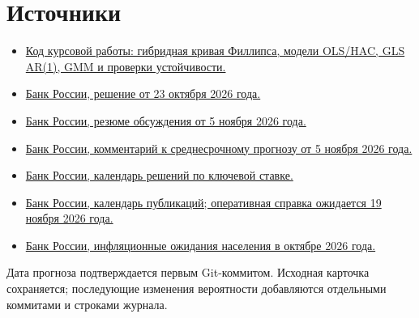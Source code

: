 \documentclass[10pt,a4paper]{article}
\newcommand{\source}[2]{\href{#1}{#2}}
\begin{document}
\section*{Источники}
\begin{itemize}
\setlength{\itemsep}{0pt}
\item \source{https://github.com/mkefimov/Philips-Curve-Inflation-and-Economic-Growth-Modelling-in-R}{Код курсовой работы: гибридная кривая Филлипса, модели OLS/HAC, GLS AR(1), GMM и проверки устойчивости.}
\item \source{https://www.cbr.ru/press/keypr/}{Банк России, решение от 23 октября 2026 года.}
\item \source{https://www.cbr.ru/dkp/mp_dec/decision_key_rate/summary_key_rate_05112026/}{Банк России, резюме обсуждения от 5 ноября 2026 года.}
\item \source{https://www.cbr.ru/dkp/mp_dec/decision_key_rate/comment_05112026/}{Банк России, комментарий к среднесрочному прогнозу от 5 ноября 2026 года.}
\item \source{https://www.cbr.ru/dkp/cal_mp/}{Банк России, календарь решений по ключевой ставке.}
\item \source{https://www.cbr.ru/calendar/}{Банк России, календарь публикаций; оперативная справка ожидается 19 ноября 2026 года.}
\item \source{https://www.cbr.ru/press/event/?id=32938}{Банк России, инфляционные ожидания населения в октябре 2026 года.}
\end{itemize}

\vfill
{\footnotesize Дата прогноза подтверждается первым Git-коммитом. Исходная карточка сохраняется; последующие изменения вероятности добавляются отдельными коммитами и строками журнала.}
\end{document}
